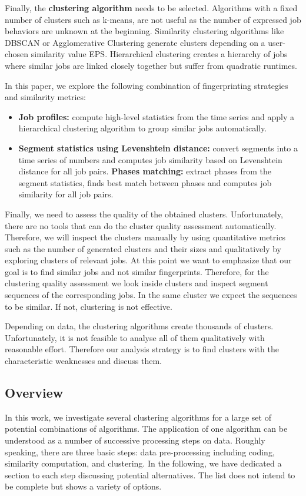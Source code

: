 \documentclass[]{llncs}
\begin{document}
Finally, the \textbf{clustering algorithm} needs to be selected.
Algorithms with a fixed number of clusters such as k-means, are not useful as the number of expressed job behaviors are unknown at the beginning.
Similarity clustering algorithms like DBSCAN or Agglomerative Clustering generate clusters depending on a user-chosen similarity value EPS.
Hierarchical clustering creates a hierarchy of jobs where similar jobs are linked closely together but suffer from quadratic runtimes.

In this paper, we explore the following combination of fingerprinting strategies and similarity metrics:

\begin{itemize}
 \item \textbf{Job profiles:} compute high-level statistics from the time series and apply a hierarchical clustering algorithm to group similar jobs automatically.
 \item \textbf{Segment statistics using Levenshtein distance:} convert segments into a time series of numbers and computes job similarity based on Levenshtein distance for all job pairs. \textbf{Phases matching:} extract phases from the segment statistics, finds best match between phases and computes job similarity for all job pairs.
\end{itemize}

Finally, we need to assess the quality of the obtained clusters.
Unfortunately, there are no tools that can do the cluster quality assessment automatically.
Therefore, we will inspect the clusters manually by using quantitative metrics such as the number of generated clusters and their sizes and qualitatively by exploring clusters of relevant jobs.
At this point we want to emphasize that our goal is to find similar jobs and not similar fingerprints.
Therefore, for the clustering quality assessment we look inside clusters and inspect segment sequences of the corresponding jobs.
In the same cluster we expect the sequences to be similar.
If not, clustering is not effective.

Depending on data, the clustering algorithms create thousands of clusters.
Unfortunately, it is not feasible to analyse all of them qualitatively with reasonable effort.
Therefore our analysis strategy is to find clusters with the characteristic weaknesses and discuss them.

\subsection{Overview}
In this work, we investigate several clustering algorithms for a large set of potential combinations of algorithms. The application of one algorithm can be understood as a number of successive processing steps on data. Roughly speaking, there are three basic steps: data pre-processing including coding, similarity computation, and clustering. In the following, we have dedicated a section to each step discussing potential alternatives. The list does not intend to be complete but shows a variety of options.
\end{document}
